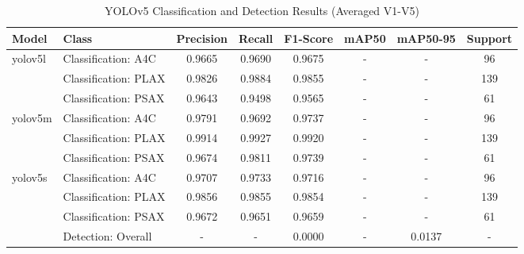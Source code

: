 \begin{table}[h]
\centering
\caption{YOLOv5 Classification and Detection Results (Averaged V1-V5)}
\label{tab:yolov5_results}
\begin{tabular}{llcccccc}
\toprule
Model & Class & Precision & Recall & F1-Score & mAP50 & mAP50-95 & Support \\
\midrule
yolov5l & Classification: A4C & 0.9665 & 0.9690 & 0.9675 & - & - & 96 \\
 & Classification: PLAX & 0.9826 & 0.9884 & 0.9855 & - & - & 139 \\
 & Classification: PSAX & 0.9643 & 0.9498 & 0.9565 & - & - & 61 \\
\midrule
yolov5m & Classification: A4C & 0.9791 & 0.9692 & 0.9737 & - & - & 96 \\
 & Classification: PLAX & 0.9914 & 0.9927 & 0.9920 & - & - & 139 \\
 & Classification: PSAX & 0.9674 & 0.9811 & 0.9739 & - & - & 61 \\
\midrule
yolov5s & Classification: A4C & 0.9707 & 0.9733 & 0.9716 & - & - & 96 \\
 & Classification: PLAX & 0.9856 & 0.9855 & 0.9854 & - & - & 139 \\
 & Classification: PSAX & 0.9672 & 0.9651 & 0.9659 & - & - & 61 \\
 & Detection: Overall & - & - & 0.0000 & - & 0.0137 & - \\
\bottomrule
\end{tabular}
\end{table}